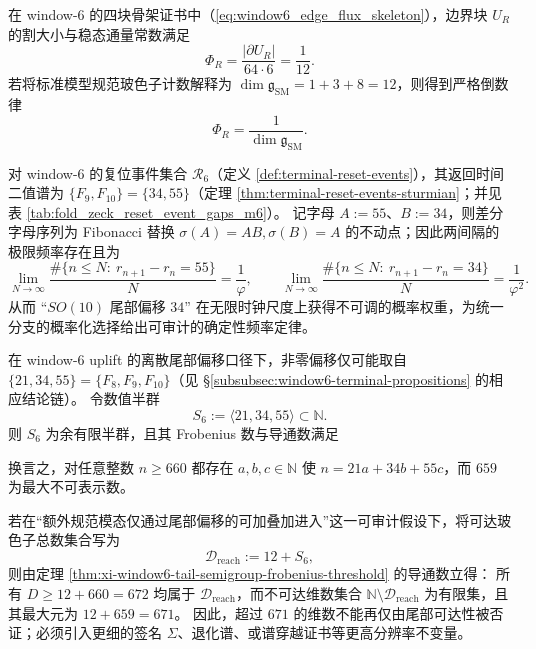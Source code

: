 \begin{corollary}\label{cor:xi-window6-reciprocal-flux-boson12}
在 window-\(6\) 的四块骨架证书中（\eqref{eq:window6_edge_flux_skeleton}），边界块 \(U_R\) 的割大小与稳态通量常数满足
\[
\Phi_R=\frac{|\partial U_R|}{64\cdot 6}=\frac{1}{12}.
\]
若将标准模型规范玻色子计数解释为 \(\dim\mathfrak g_{\mathrm{SM}}=1+3+8=12\)，则得到严格倒数律
\[
\Phi_R=\frac{1}{\dim\mathfrak g_{\mathrm{SM}}}.
\]
\end{corollary}

\begin{corollary}\label{cor:xi-window6-reset-clock-gap-frequencies}
对 window-\(6\) 的复位事件集合 \(\mathcal R_6\)（定义 \ref{def:terminal-reset-events}），其返回时间二值谱为
\(\{F_9,F_{10}\}=\{34,55\}\)（定理 \ref{thm:terminal-reset-events-sturmian}；并见表 \ref{tab:fold_zeck_reset_event_gaps_m6}）。
记字母 \(A:=55\)、\(B:=34\)，则差分字母序列为 Fibonacci 替换 \(\sigma(A)=AB,\sigma(B)=A\) 的不动点；因此两间隔的极限频率存在且为
\[
\lim_{N\to\infty}\frac{\#\{n\le N:\ r_{n+1}-r_n=55\}}{N}=\frac{1}{\varphi},
\qquad
\lim_{N\to\infty}\frac{\#\{n\le N:\ r_{n+1}-r_n=34\}}{N}=\frac{1}{\varphi^2}.
\]
从而 “\(SO(10)\) 尾部偏移 \(34\)” 在无限时钟尺度上获得不可调的概率权重，为统一分支的概率化选择给出可审计的确定性频率定律。
\end{corollary}

\begin{theorem}\label{thm:xi-window6-tail-semigroup-frobenius-threshold}
在 window-\(6\) uplift 的离散尾部偏移口径下，非零偏移仅可能取自
\(\{21,34,55\}=\{F_8,F_9,F_{10}\}\)（见 \S\ref{subsubsec:window6-terminal-propositions} 的相应结论链）。
令数值半群
\[
S_6:=\langle 21,34,55\rangle\subset\mathbb N.
\]
则 \(S_6\) 为余有限半群，且其 Frobenius 数与导通数满足

换言之，对任意整数 \(n\ge 660\) 都存在 \(a,b,c\in\mathbb N\) 使
\(
n=21a+34b+55c
\)，而 \(659\) 为最大不可表示数。
\end{theorem}

\begin{corollary}\label{cor:xi-window6-dimension-sieve-finite}
若在“额外规范模态仅通过尾部偏移的可加叠加进入”这一可审计假设下，将可达玻色子总数集合写为
\[
\mathcal D_{\mathrm{reach}}:=12+S_6,
\]
则由定理 \ref{thm:xi-window6-tail-semigroup-frobenius-threshold} 的导通数立得：
所有 \(D\ge 12+660=672\) 均属于 \(\mathcal D_{\mathrm{reach}}\)，而不可达维数集合 \(\mathbb N\setminus\mathcal D_{\mathrm{reach}}\) 为有限集，且其最大元为 \(12+659=671\)。
因此，超过 \(671\) 的维数不能再仅由尾部可达性被否证；必须引入更细的签名 \(\Sigma\)、退化谱、或谱穿越证书等更高分辨率不变量。
\end{corollary}

